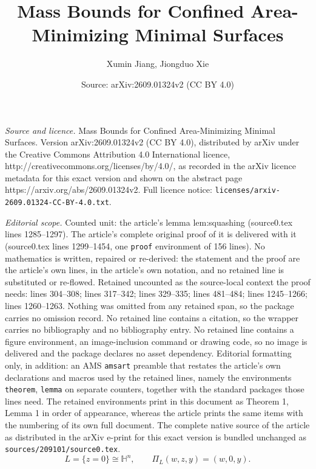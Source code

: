 \documentclass[10pt,a4paper]{amsart}
\title{Mass Bounds for Confined Area-Minimizing Minimal Surfaces}
\author{Xumin Jiang, Jiongduo Xie}
\date{Source: arXiv:2609.01324v2 (CC BY 4.0)}
\newcommand{\Hyp}{\mathbb H}
\begin{document}
\maketitle

\noindent\emph{Source and licence.} Mass Bounds for Confined Area-Minimizing Minimal Surfaces. Version arXiv:2609.01324v2 (CC BY 4.0), distributed by arXiv under the Creative Commons Attribution 4.0 International licence, http://creativecommons.org/licenses/by/4.0/, as recorded in the arXiv licence metadata for this exact version and shown on the abstract page https://arxiv.org/abs/2609.01324v2. Full licence notice: \texttt{licenses/arxiv-2609.01324-CC-BY-4.0.txt}.\par\smallskip

\noindent\textit{Editorial scope.} Counted unit: the article's lemma lem:squashing (source0.tex lines 1285--1297). The article's complete original proof of it is delivered with it (source0.tex lines 1299--1454, one \texttt{proof} environment of 156 lines). No mathematics is written, repaired or re-derived: the statement and the proof are the article's own lines, in the article's own notation, and no retained line is substituted or re-flowed.  Retained uncounted as the source-local context the proof needs: lines 304--308; lines 317--342; lines 329--335; lines 481--484; lines 1245--1266; lines 1260--1263.  Nothing was omitted from any retained span, so the package carries no omission record.  No retained line contains a citation, so the wrapper carries no bibliography and no bibliography entry.  No retained line contains a figure environment, an image-inclusion command or drawing code, so no image is delivered and the package declares no asset dependency.  Editorial formatting only, in addition: an AMS \texttt{amsart} preamble that restates the article's own declarations and macros used by the retained lines, namely the environments \texttt{theorem}, \texttt{lemma} on separate counters, together with the standard packages those lines need.  The retained environments print in this document as Theorem 1, Lemma 1 in order of appearance, whereas the article prints the same items with the numbering of its own full document.  The complete native source of the article as distributed in the arXiv e-print for this exact version is bundled unchanged as \texttt{sources/209101/source0.tex}.
\begin{equation}\label{eq:vertical-plane-projection}
 L=\{z=0\}\cong\Hyp^n,
 \qquad
 \Pi_L(w,z,y)=(w,0,y).
\end{equation}
\end{document}
